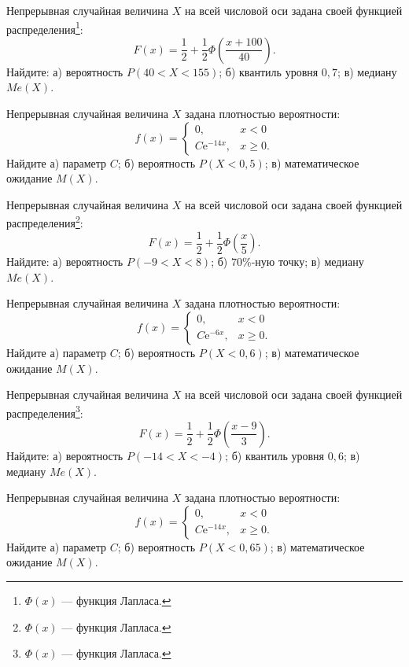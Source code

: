 \vfill

\newpage\setcounter{zad}{0}

\z Непрерывная случайная величина $X$ на всей числовой оси задана своей функцией распределения\footnote{$\Phi(x)$ --- функция Лапласа.}: $$ F(x) = \frac{1}{2} + \frac{1}{2}\Phi\left( \frac{x + 100}{40} \right). $$ Найдите: а) вероятность $P(40 < X < 155)$; б) квантиль уровня $0{,}7$; в) медиану $Me(X)$.


\vfill

\z Непрерывная случайная величина $X$ задана плотностью вероятности: $$ f(x) = \begin{cases}0, & x < 0 \\ C\mathrm{e}^{-14x}, & x \geqslant 0.\end{cases} $$ Найдите а) параметр $C$; б) вероятность $P(X < 0{,}5)$; в) математическое ожидание $M(X)$.
 

\vfill

\newpage\setcounter{zad}{0}

\z Непрерывная случайная величина $X$ на всей числовой оси задана своей функцией распределения\footnote{$\Phi(x)$ --- функция Лапласа.}: $$ F(x) = \frac{1}{2} + \frac{1}{2}\Phi\left( \frac{x}{5} \right). $$ Найдите: а) вероятность $P(-9 < X < 8)$; б) $70\%$-ную точку; в) медиану $Me(X)$.


\vfill

\z Непрерывная случайная величина $X$ задана плотностью вероятности: $$ f(x) = \begin{cases}0, & x < 0 \\ C\mathrm{e}^{-6x}, & x \geqslant 0.\end{cases} $$ Найдите а) параметр $C$; б) вероятность $P(X < 0{,}6)$; в) математическое ожидание $M(X)$.
 

\vfill

\newpage\setcounter{zad}{0}

\z Непрерывная случайная величина $X$ на всей числовой оси задана своей функцией распределения\footnote{$\Phi(x)$ --- функция Лапласа.}: $$ F(x) = \frac{1}{2} + \frac{1}{2}\Phi\left( \frac{x - 9}{3} \right). $$ Найдите: а) вероятность $P(-14 < X < -4)$; б) квантиль уровня $0{,}6$; в) медиану $Me(X)$.


\vfill

\z Непрерывная случайная величина $X$ задана плотностью вероятности: $$ f(x) = \begin{cases}0, & x < 0 \\ C\mathrm{e}^{-14x}, & x \geqslant 0.\end{cases} $$ Найдите а) параметр $C$; б) вероятность $P(X < 0{,}65)$; в) математическое ожидание $M(X)$.
 

